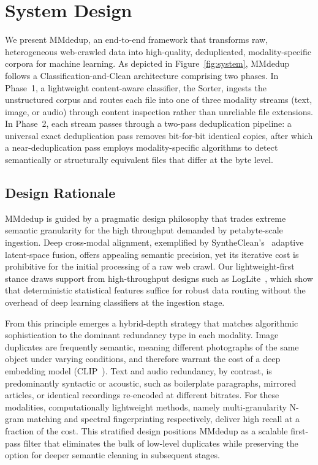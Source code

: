 \documentclass[sigconf, nonacm]{acmart}
\begin{document}
\section{System Design}
\label{sec:design}


We present MMdedup, an end-to-end framework that transforms raw, heterogeneous web-crawled data into high-quality, deduplicated, modality-specific corpora for machine learning. As depicted in Figure~\ref{fig:system}, MMdedup follows a Classification-and-Clean architecture comprising two phases. In Phase~1, a lightweight content-aware classifier, the Sorter, ingests the unstructured corpus and routes each file into one of three modality streams (text, image, or audio) through content inspection rather than unreliable file extensions. In Phase~2, each stream passes through a two-pass deduplication pipeline: a universal exact deduplication pass removes bit-for-bit identical copies, after which a near-deduplication pass employs modality-specific algorithms to detect semantically or structurally equivalent files that differ at the byte level.


\subsection{Design Rationale}

MMdedup is guided by a pragmatic design philosophy that trades extreme semantic granularity for the high throughput demanded by petabyte-scale ingestion. Deep cross-modal alignment, exemplified by SyntheClean's~\cite{chen2025syntheclean} adaptive latent-space fusion, offers appealing semantic precision, yet its iterative cost is prohibitive for the initial processing of a raw web crawl. Our lightweight-first stance draws support from high-throughput designs such as LogLite~\cite{tang2025loglite}, which show that deterministic statistical features suffice for robust data routing without the overhead of deep learning classifiers at the ingestion stage.

From this principle emerges a hybrid-depth strategy that matches algorithmic sophistication to the dominant redundancy type in each modality. Image duplicates are frequently semantic, meaning different photographs of the same object under varying conditions, and therefore warrant the cost of a deep embedding model (CLIP~\cite{radford2021learning}). Text and audio redundancy, by contrast, is predominantly syntactic or acoustic, such as boilerplate paragraphs, mirrored articles, or identical recordings re-encoded at different bitrates. For these modalities, computationally lightweight methods, namely multi-granularity N-gram matching and spectral fingerprinting respectively, deliver high recall at a fraction of the cost. This stratified design positions MMdedup as a scalable first-pass filter that eliminates the bulk of low-level duplicates while preserving the option for deeper semantic cleaning in subsequent stages.
\end{document}
